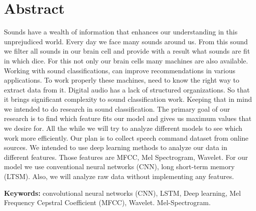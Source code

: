 \section*{Abstract}
Sounds have a wealth of information that enhances our understanding in this unprejudiced world. Every day we face many sounds around us. From this sound we filter all sounds in our brain cell and provide with a result what sounds are fit in which dice. For this not only our brain cells many machines are also available. Working with sound classifications, can improve recommendations in various applications. To work properly these machines, need to know the right way to extract data from it. Digital audio has a lack of structured organizations. So that it brings significant complexity to sound classification work. Keeping that in mind we intended to do research in sound classification. The primary goal of our research is to find which feature fits our model and gives us maximum values that we desire for. All the while we will try to analyze different models to see which work more efficiently. Our plan is to collect speech command dataset from online sources. We intended to use deep learning methods to analyze our data in different features. Those features are MFCC, Mel Spectrogram, Wavelet. For our model we use conventional neural networks (CNN), long short-term memory (LTSM). Also, we will analyze raw data without implementing any features. 




\vspace{1cm}
\textbf{Keywords:}  convolutional neural networks (CNN), LSTM, Deep learning, Mel Frequency Cepstral Coefficient (MFCC), Wavelet. Mel-Spectrogram.
\pagebreak
